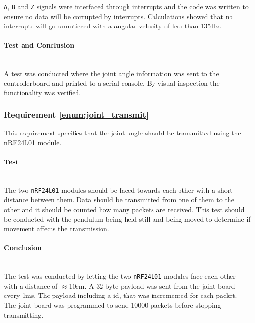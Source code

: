 {\texttt{A}, \texttt{B} and \texttt{Z} signals were interfaced through interrupts and the code was written to ensure no data will be corrupted by interrupts.
Calculations showed that no interrupts will go unnotieced with a angular velocity of less than 135Hz. 

\paragraph{Test and Conclusion}~\\
A test was conducted where the joint angle information was sent to the controllerboard and printed to a serial console. 
By visual inspection the functionality was verified.

\subsubsection{Requirement \ref{enum:joint_transmit}} %
\label{ssub:requirement_enum:joint_transmit}
This requirement specifies that the joint angle should be transmitted using the nRF24L01 module.

\paragraph{Test}~\\
The two \texttt{nRF24L01} modules should be faced towards each other with a short distance between them.
Data should be transmitted from one of them to the other and it should be counted how many packets are received.
This test should be conducted with the pendulum being held still and being moved to determine if movement affects the transmission.

\paragraph{Conclusion}~\\
The test was conducted by letting the two \texttt{nRF24L01} modules face each other with a distance of $\approx$10cm.
A 32 byte payload was sent from the joint board every 1ms. 
The payload including a id, that was incremented for each packet.
The joint board was programmed to send 10000 packets before stopping transmitting. 

}
